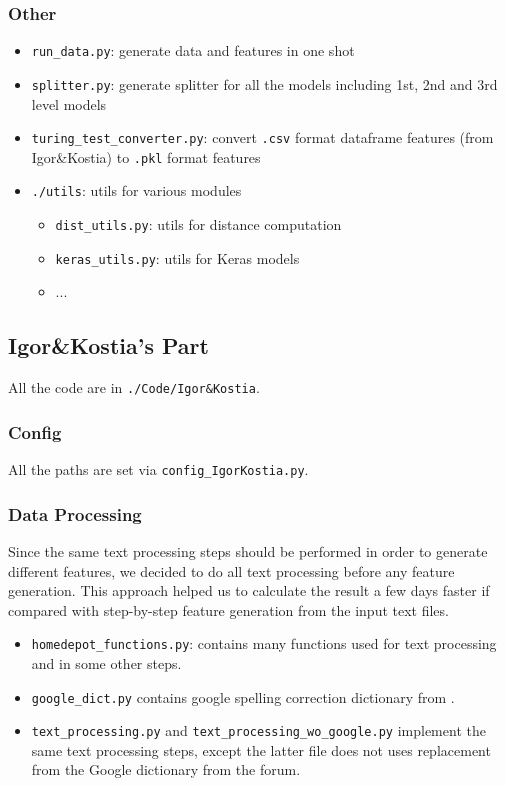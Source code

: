 \documentclass[12pt]{article}
\begin{document}
\subsubsection{Other}
\begin{itemize}
\item \texttt{run\_data.py}: generate data and features in one shot
\item \texttt{splitter.py}: generate splitter for all the models including 1st, 2nd and 3rd level models
\item \texttt{turing\_test\_converter.py}: convert \texttt{.csv} format dataframe features (from Igor\&Kostia) to \texttt{.pkl} format features
\item \texttt{./utils}: utils for various modules
\begin{itemize}
\item \texttt{dist\_utils.py}: utils for distance computation
\item \texttt{keras\_utils.py}: utils for Keras models
\item ...
\end{itemize}
\end{itemize}



\subsection{Igor\&Kostia's Part}
\label{subsec:code_IandK}
All the code are in \texttt{./Code/Igor\&Kostia}.
\subsubsection{Config}
All the paths  are set via \texttt{config\_IgorKostia.py}.


\subsubsection{Data Processing}
Since the same text processing steps should be performed in order to generate different features, we decided to do all text processing before any feature generation. This approach helped us to calculate the result a few days faster if compared with step-by-step feature generation from the input text files.
\begin{itemize}
\item \texttt{homedepot\_functions.py}: contains many functions used for text processing and in some other steps.
\item  \texttt{google\_dict.py}  contains google spelling correction dictionary from \cite{Google_dict}.
\item \texttt{text\_processing.py} and  \texttt{text\_processing\_wo\_google.py} implement the same text processing steps, except the latter file does not uses replacement from the Google dictionary from the forum.
\end{itemize}
\end{document}

